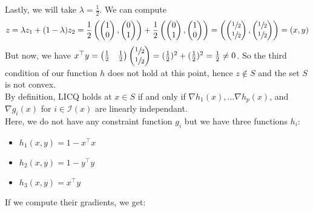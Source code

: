 \documentclass{article}
\newcommand{\tp}{^\top}
\begin{document}
Lastly, we will take $\lambda=\frac{1}{2}$. We can compute 
$$
z=\lambda z_1 + (1-\lambda) z_2
=\frac{1}{2}
\left(
	\begin{pmatrix} 1\\ 0\end{pmatrix},
	\begin{pmatrix} 0\\ 1\end{pmatrix}
\right)
+\frac{1}{2}
\left(
	\begin{pmatrix} 0\\ 1\end{pmatrix},
	\begin{pmatrix} 1\\ 0\end{pmatrix}
\right)
=
\left(
	\begin{pmatrix} \sfrac{1}{2}\\ \sfrac{1}{2}\end{pmatrix},
	\begin{pmatrix} \sfrac{1}{2}\\ \sfrac{1}{2}\end{pmatrix}
\right)
=(x,y)$$
But now, we have $x\tp y=
\begin{pmatrix} \frac{1}{2}& \frac{1}{2}\end{pmatrix}
\begin{pmatrix} \sfrac{1}{2}\\ \sfrac{1}{2}\end{pmatrix}
=(\frac{1}{2})^2+(\frac{1}{2})^2=\frac{1}{2} \neq 0$. So the third condition of our function $h$ does not hold at this point, hence $z\notin S$ and the set $S$ is not convex.\\

By definition, LICQ holds at $x\in S$ if and only if $\nabla h_1(x),\dots\nabla h_p(x)$, and $\nabla g_i(x)$ for $i\in \mathcal I(x) $ are linearly independant.\\
Here, we do not have any constraint function $g_i$ but we have three functions $h_i$:
\begin{itemize}
\item  $h_1(x,y)=1-x\tp x$
\item $h_2(x,y)=1-y\tp y$
\item $h_3(x,y)= x\tp y$
\end{itemize} 
If we compute their gradients, we get:
\end{document}
